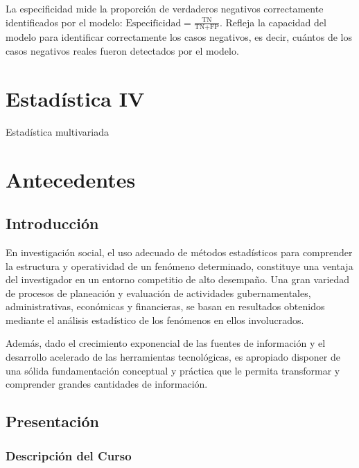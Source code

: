 \documentclass[
  letterpaper,
  DIV=11,
  numbers=noendperiod]{scrreprt}
\begin{document}
La especificidad mide la proporción de verdaderos negativos
correctamente identificados por el modelo:
\(\text{Especificidad} = \frac{\text{TN}}{\text{TN} + \text{FP}}\).
Refleja la capacidad del modelo para identificar correctamente los casos
negativos, es decir, cuántos de los casos negativos reales fueron
detectados por el modelo.


\chapter{Estadística IV}\label{estaduxedstica-iv}

Estadística multivariada

\hfill\break


\chapter{Antecedentes}\label{antecedentes-1}

\section{Introducción}\label{introducciuxf3n-2}

En investigación social, el uso adecuado de métodos estadísticos para
comprender la estructura y operatividad de un fenómeno determinado,
constituye una ventaja del investigador en un entorno competitio de alto
desempaño. Una gran variedad de procesos de planeación y evaluación de
actividades gubernamentales, administrativas, económicas y financieras,
se basan en resultados obtenidos mediante el análisis estadístico de los
fenómenos en ellos involucrados.

Además, dado el crecimiento exponencial de las fuentes de información y
el desarrollo acelerado de las herramientas tecnológicas, es apropiado
disponer de una sólida fundamentación conceptual y práctica que le
permita transformar y comprender grandes cantidades de información.

\section{Presentación}\label{presentaciuxf3n-1}

\subsection{Descripción del Curso}\label{descripciuxf3n-del-curso}
\end{document}
